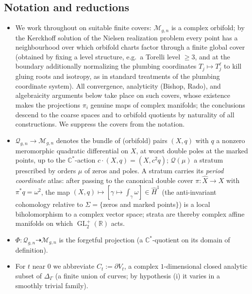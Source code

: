 \documentclass[11pt]{article}
\newcommand{\C}{\mathbb{C}}
\newcommand{\R}{\mathbb{R}}
\newcommand{\cQ}{\mathcal{Q}}
\newcommand{\M}{\mathcal{M}}
\DeclareMathOperator{\GL}{GL}
\theoremstyle{definition}
\theoremstyle{remark}
\begin{document}
\subsection{Notation and reductions}
\begin{itemize}[leftmargin=1.6em]
\item We work throughout on suitable finite covers: $\M_{g,n}$ is a complex
orbifold; by the Kerckhoff solution of the Nielsen realization problem every
point has a neighbourhood over which orbifold charts factor through a finite
global cover (obtained by fixing a level structure, e.g.\ a Torelli level
$\ge 3$, and at the boundary additionally normalizing the plumbing
coordinates $T_j \mapsto T_j^{\ell}$ to kill gluing roots and isotropy, as
in standard treatments of the plumbing coordinate system). All convergence,
analyticity (Bishop, Rado), and algebraicity arguments below take place on
such covers, whose existence makes the projections $\pi_i$ genuine maps of
complex manifolds; the conclusions descend to the coarse spaces and to
orbifold quotients by naturality of all constructions. We suppress the
covers from the notation.
\item $\cQ_{g,n} \to \M_{g,n}$ denotes the bundle of (orbifold) pairs
$(X,q)$ with $q$ a nonzero meromorphic quadratic differential on $X$, at
worst double poles at the marked points, up to the $\C^*$-action
$c \cdot (X,q) = (X, c^2 q)$; $\cQ(\mu)$ a stratum prescribed by orders
$\mu$ of zeros and poles. A stratum carries its \emph{period coordinate}
atlas: after passing to the canonical double cover $\pi:\widehat{X}\to X$
with $\pi^* q = \omega^2$, the map
$(X,q) \mapsto [\gamma \mapsto \int_\gamma \omega] \in \widehat{H}^1$ (the
anti-invariant cohomology relative to $\Sigma = \{$zeros and marked
points$\}$) is a local biholomorphism to a complex vector space; strata are
thereby complex affine manifolds on which $\GL_2^+(\R)$ acts.
\item $\Phi : \cQ_{g,n} \dashrightarrow \M_{g,n}$ is the forgetful
projection (a $\C^*$-quotient on its domain of definition).
\item For $t$ near $0$ we abbreviate $C_t := \partial V_t$, a complex
$1$-dimensional closed analytic subset of $\Delta_\Gamma$ (a finite union of
curves; by hypothesis (i) it varies in a smoothly trivial family).
\end{itemize}
\end{document}
